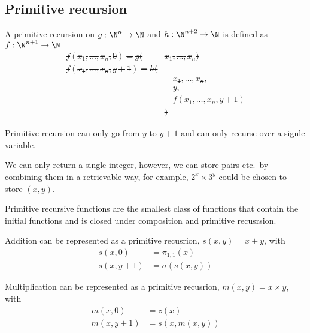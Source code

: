 \documentclass{article}
\begin{document}
\subsection{Primitive recursion}
\begin{definition}
    A primitive recursion on
    \(g:\N^n\to\N\) and
    \(h:\N^{n+2}\to\N\)
    is defined as \(f:\N^{n+1}\to\N\) \st
    \begin{align*}
        f\left(x_1,\ldots,x_n,0\right) = g(&x_1,\ldots,x_n) \\
        f\left(x_1,\ldots,x_n,y+1\right) = h(&
            \\
            &\quad x_1,\ldots,x_n, \\
            &\quad y, \\
            &\quad f\left(x_1,\ldots,x_n,y+1\right) \\
        &)
    \end{align*}
\end{definition}
\begin{note}
    Primitive recursion can only go from \(y\) to \(y+1\)
    and can only recurse over a signle variable.
\end{note}
\begin{note}
    We can only return a single integer, however,
    we can store pairs etc.\ by combining them in a retrievable way,
    for example, \(2^x \times 3^y\) could be chosen to store \(\left( x,y \right)\).
\end{note}
\begin{theorem}
    Primitive recursive functions are the smallest class of functions
    that contain the initial functions and
    is closed under composition and primitive recusrsion.
\end{theorem}
\begin{theorem}
    Addition can be represented as a primitive recusrion, \(s(x, y) = x+y\),
    with
    \begin{align*}
        s(x,0) &= \pi_{1,1}(x) \\
        s(x,y+1) &= \sigma(s(x,y))
    \end{align*}
\end{theorem}
\begin{theorem}
    Multiplication can be represented as a primitive recusrion, \(m(x, y) = x\times y\),
    with
    \begin{align*}
        m(x,0) &= z(x) \\
        m(x,y+1) &= s(x, m(x,y))
    \end{align*}
\end{theorem}
\end{document}

